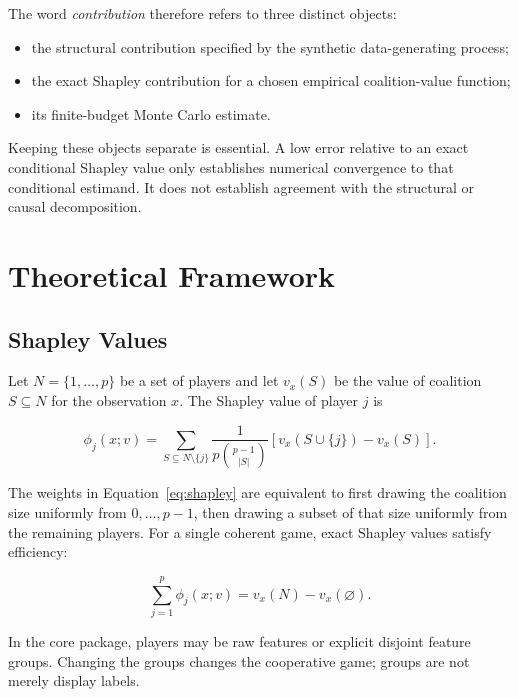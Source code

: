 \documentclass[11pt]{article}
\begin{document}
The word \emph{contribution} therefore refers to three distinct objects:

\begin{itemize}
  \item the structural contribution specified by the synthetic data-generating
        process;
  \item the exact Shapley contribution for a chosen empirical coalition-value
        function;
  \item its finite-budget Monte Carlo estimate.
\end{itemize}

Keeping these objects separate is essential.  A low error relative to an exact
conditional Shapley value only establishes numerical convergence to that
conditional estimand.  It does not establish agreement with the structural or
causal decomposition.

\section{Theoretical Framework}

\subsection{Shapley Values}

Let \(N=\{1,\ldots,p\}\) be a set of players and let \(v_x(S)\) be the value of
coalition \(S\subseteq N\) for the observation \(x\).  The Shapley value of
player \(j\) is

\begin{equation}
\phi_j(x;v)
=
\sum_{S\subseteq N\setminus\{j\}}
\frac{1}{p\binom{p-1}{|S|}}
\left[v_x(S\cup\{j\})-v_x(S)\right].
\label{eq:shapley}
\end{equation}

The weights in Equation~\eqref{eq:shapley} are equivalent to first drawing the
coalition size uniformly from \(0,\ldots,p-1\), then drawing a subset of that
size uniformly from the remaining players.  For a single coherent game, exact
Shapley values satisfy efficiency:

\begin{equation}
\sum_{j=1}^{p}\phi_j(x;v)=v_x(N)-v_x(\varnothing).
\label{eq:efficiency}
\end{equation}

In the core package, players may be raw features or explicit disjoint feature
groups.  Changing the groups changes the cooperative game; groups are not
merely display labels.
\end{document}
